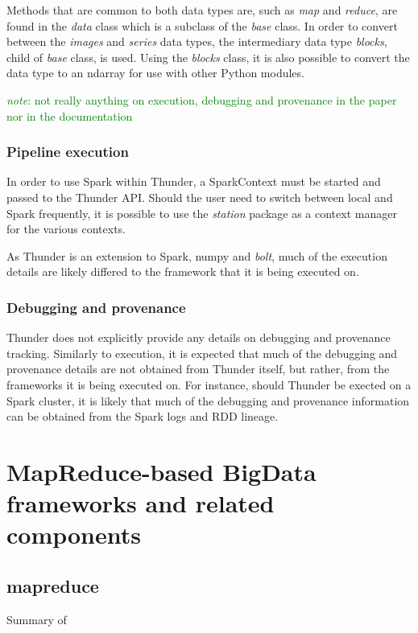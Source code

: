 \documentclass{report}
\newcommand{\note}[1]{\textcolor{green}{\textit{note}: #1}}
\begin{document}
        Methods that are common to both data types are, such as \textit{map} and \textit{reduce}, are found in the 
        \textit{data} class which is a subclass of the
        \textit{base} class. In order to convert between the \textit{images} and \textit{series} data types, the
        intermediary data type \textit{blocks}, child of \textit{base} class,  is used. 
        Using the \textit{blocks} class, it is also possible to convert the data type to an ndarray for use with other
        Python modules. 

        \note{not really anything on execution, debugging and provenance in the paper nor in the documentation}
        \subsection{Pipeline execution}
        In order to use Spark within Thunder, a SparkContext must be started and passed to the Thunder API. Should
        the user need to switch between local and Spark frequently, it is possible to use the \textit{station} package
        as a context manager for the various contexts.

        As Thunder is an extension to Spark, numpy and \textit{bolt}, much of the execution details are likely differed 
        to the 
        framework that it is being executed on.

        \subsection{Debugging and provenance}
        Thunder does not explicitly provide any details on debugging and provenance tracking. Similarly to execution,
        it is expected that much of the debugging and provenance details are not obtained from Thunder itself, but
        rather, from the frameworks it is being executed on. For instance, should Thunder be exected on a Spark cluster,
        it is likely that much of the debugging and provenance information can be obtained from the Spark logs and RDD
        lineage.
    
\chapter{MapReduce-based BigData frameworks and related components} 
    \section{mapreduce}
        Summary of ~\cite{mapred}
\end{document}
